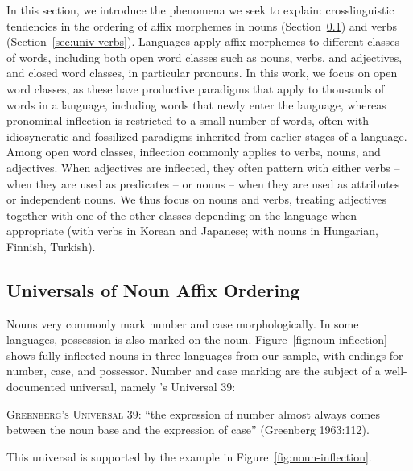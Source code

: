 \documentclass[man]{apa7}
\newcommand{\citet}{\Textcite}
\begin{document}
In this section, we introduce the phenomena we seek to explain: crosslinguistic tendencies in the ordering of affix morphemes in nouns (Section~\ref{sec:univ-nouns}) and verbs (Section~\ref{sec:univ-verbs}).
Languages apply affix morphemes to different classes of words, including both open word classes such as nouns, verbs, and adjectives, and closed word classes, in particular pronouns.
In this work, we focus on open word classes, as these have productive paradigms that apply to thousands of words in a language, including words that newly enter the language, whereas pronominal inflection is restricted to a small number of words, often with idiosyncratic and fossilized paradigms inherited from earlier stages of a language.
Among open word classes, inflection commonly applies to verbs, nouns, and adjectives.
When adjectives are inflected, they often pattern with either verbs -- when they are used as predicates -- or nouns -- when they are used as attributes or independent nouns.
We thus focus on nouns and verbs, treating adjectives together with one of the other classes depending on the language when appropriate (with verbs in Korean and Japanese; with nouns in Hungarian, Finnish, Turkish).

\subsection{Universals of Noun Affix Ordering}\label{sec:univ-nouns}
Nouns very commonly mark number and case morphologically.
In some languages, possession is also marked on the noun.
Figure~\ref{fig:noun-inflection} shows fully inflected nouns in three languages from our sample, with endings for number, case, and possessor.
Number and case marking are the subject of a well-documented universal, namely \citet{greenberg1963universals}'s Universal 39:

\begin{adjustwidth}{6em}{6em}
\textsc{Greenberg's Universal 39}:
``the expression of number almost always comes between the noun base and the expression of case'' (Greenberg 1963:112).
\end{adjustwidth}
This universal is supported by the example in Figure~\ref{fig:noun-inflection}.

\end{document}

